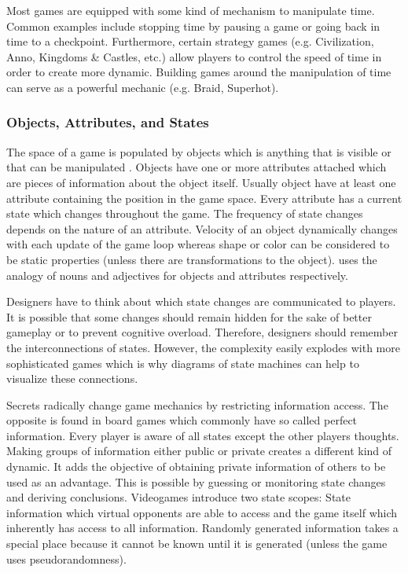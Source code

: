 Most games are equipped with some kind of mechanism to manipulate time.
Common examples include stopping time by pausing a game or going back in time to a checkpoint.
Furthermore, certain strategy games (e.g. Civilization, Anno, Kingdoms \& Castles, etc.) allow players to control the speed of time in order to create more dynamic.
Building games around the manipulation of time can serve as a powerful mechanic (e.g. Braid, Superhot).

\subsubsection{Objects, Attributes, and States} \label{sec:objects-attributes}
The space of a game is populated by objects which is anything that is visible or that can be manipulated \cite{Schell2014}.
Objects have one or more attributes attached which are pieces of information about the object itself.
Usually object have at least one attribute containing the position in the game space.
Every attribute has a current state which changes throughout the game.
The frequency of state changes depends on the nature of an attribute.
Velocity of an object dynamically changes with each update of the game loop whereas shape or color can be considered to be static properties (unless there are transformations to the object).
\citeauthor{Schell2014} uses the analogy of nouns and adjectives for objects and attributes respectively.

Designers have to think about which state changes are communicated to players.
It is possible that some changes should remain hidden for the sake of better gameplay or to prevent cognitive overload.
Therefore, designers should remember the interconnections of states.
However, the complexity easily explodes with more sophisticated games which is why diagrams of state machines can help to visualize these connections.

Secrets radically change game mechanics by restricting information access.
The opposite is found in board games which commonly have so called perfect information.
Every player is aware of all states except the other players thoughts.
Making groups of information either public or private creates a different kind of dynamic.
It adds the objective of obtaining private information of others to be used as an advantage.
This is possible by guessing or monitoring state changes and deriving conclusions.
Videogames introduce two state scopes: State information which virtual opponents are able to access and the game itself which inherently has access to all information.
Randomly generated information takes a special place because it cannot be known until it is generated (unless the game uses pseudorandomness).

